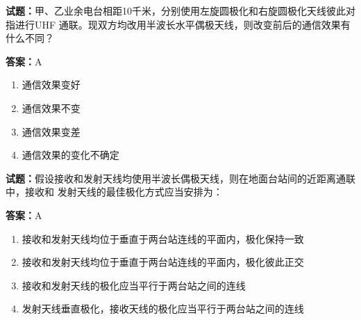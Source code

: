 \documentclass{ctexbook}
\begin{document}




\vspace{1em}

\textbf{试题：}甲、乙业余电台相距10千米，分别使用左旋圆极化和右旋圆极化天线彼此对指进行UHF
通联。现双方均改用半波长水平偶极天线，则改变前后的通信效果有什么不同？ 

\textbf{答案：}A 

\begin{enumerate}[leftmargin=3em]
  \item 通信效果变好 

  \item 通信效果不变 

  \item 通信效果变差 

  \item 通信效果的变化不确定 

\end{enumerate}





\vspace{1em}

\textbf{试题：}假设接收和发射天线均使用半波长偶极天线，则在地面台站间的近距离通联中，接收和
发射天线的最佳极化方式应当安排为： 

\textbf{答案：}A 

\begin{enumerate}[leftmargin=3em]
  \item 接收和发射天线均位于垂直于两台站连线的平面内，极化保持一致 

  \item 接收和发射天线均位于垂直于两台站连线的平面内，极化彼此正交 

  \item 接收和发射天线的极化应当平行于两台站之间的连线 

  \item 发射天线垂直极化，接收天线的极化应当平行于两台站之间的连线 

\end{enumerate}






\vspace{1em}
\end{document}
